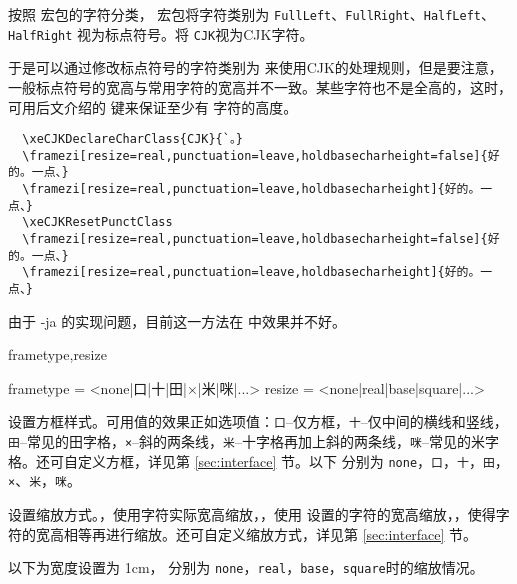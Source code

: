 \documentclass{ctxdoc}
\begin{document}
\begin{texnote}
  按照  宏包的字符分类， 宏包将字符类别为 \verb|FullLeft|、\verb|FullRight|、\verb|HalfLeft|、\verb|HalfRight| 视为标点符号。将 \verb|CJK|视为CJK字符。

于是可以通过修改标点符号的字符类别为  来使用CJK的处理规则，但是要注意，一般标点符号的宽高与常用字符的宽高并不一致。某些字符也不是全高的，这时，可用后文介绍的  键来保证至少有  字符的高度。
\begin{verbatim}
  \xeCJKDeclareCharClass{CJK}{`。}
  \framezi[resize=real,punctuation=leave,holdbasecharheight=false]{好的。一点、}
  \framezi[resize=real,punctuation=leave,holdbasecharheight]{好的。一点、}
  \xeCJKResetPunctClass
  \framezi[resize=real,punctuation=leave,holdbasecharheight=false]{好的。一点、}
  \framezi[resize=real,punctuation=leave,holdbasecharheight]{好的。一点、}
\end{verbatim}

\xeCJKResetPunctClass


由于 \LuaTeX-ja 的实现问题，目前这一方法在 \LuaTeX{} 中效果并不好。
\end{texnote}

\begin{function}{frametype,resize}
  \begin{syntax}
    frametype = <none|口|十|田|×|米|咪|...> 
    resize    = <none|real|base|square|...> 
  \end{syntax}
   设置方框样式。可用值的效果正如选项值：\verb|口|--仅方框，\verb|十|--仅中间的横线和竖线，\verb|田|--常见的田字格，\verb|×|--斜的两条线，\verb|米|--十字格再加上斜的两条线，\verb|咪|--常见的米字格。还可自定义方框，详见第 \ref{sec:interface} 节。以下  分别为 \verb|none|，\verb|口|，\verb|十|，\verb|田|，\verb|×|、\verb|米|，\verb|咪|。

  {
  }

   设置缩放方式。，使用字符实际宽高缩放，，使用  设置的字符的宽高缩放，，使得字符的宽高相等再进行缩放。还可自定义缩放方式，详见第 \ref{sec:interface} 节。

  以下为宽度设置为 1cm， 分别为 \verb|none|，\verb|real|，\verb|base|，\verb|square|时的缩放情况。

  {
  }
\end{function}
\end{document}
